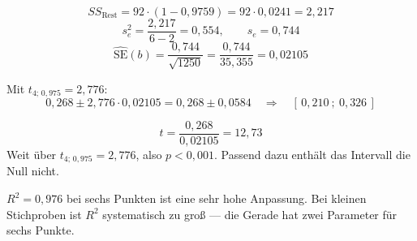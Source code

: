 \begin{aufgabe}
\[ SS_{\text{Rest}} = 92 \cdot (1 - 0{,}9759) = 92 \cdot 0{,}0241 = 2{,}217 \]
\[ s_e^2 = \frac{2{,}217}{6-2} = 0{,}554, \qquad s_e = 0{,}744 \]
\[ \widehat{\mathrm{SE}}(b) = \frac{0{,}744}{\sqrt{1250}} = \frac{0{,}744}{35{,}355} = 0{,}02105 \]

Mit $t_{4;\,0{,}975} = 2{,}776$:
\[ 0{,}268 \pm 2{,}776 \cdot 0{,}02105 = 0{,}268 \pm 0{,}0584 \quad\Longrightarrow\quad [\,0{,}210\ ;\ 0{,}326\,] \]

\[ t = \frac{0{,}268}{0{,}02105} = 12{,}73 \]
Weit über $t_{4;\,0{,}975} = 2{,}776$, also $p < 0{,}001$. Passend dazu enthält das Intervall die Null nicht. \checkmark

$R^2 = 0{,}976$ bei sechs Punkten ist eine sehr hohe Anpassung. Bei kleinen Stichproben ist $R^2$ systematisch zu groß --- die Gerade hat zwei Parameter für sechs Punkte.

\begin{center}
\begin{minipage}{0.86\textwidth}
\end{minipage}
\end{center}
\end{aufgabe}

